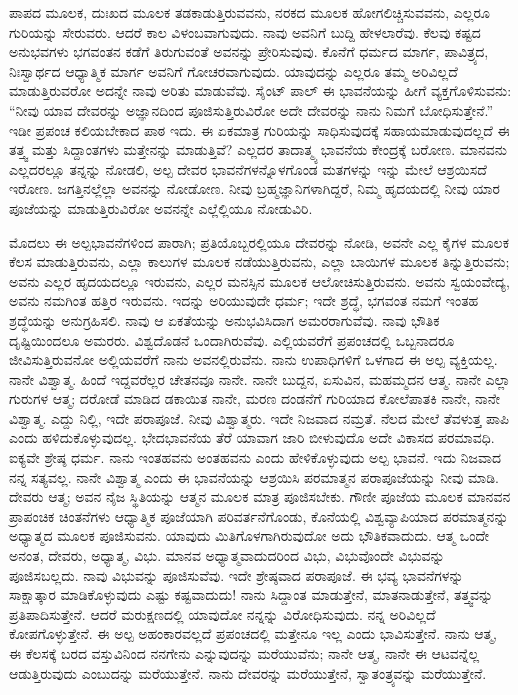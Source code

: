 ಪಾಪದ ಮೂಲಕ, ದುಃಖದ ಮೂಲಕ ತಡಕಾಡುತ್ತಿರುವವನು, ನರಕದ ಮೂಲಕ ಹೋಗಲಿಚ್ಚಿಸುವವನು, ಎಲ್ಲರೂ ಗುರಿಯನ್ನು ಸೇರುವರು. ಆದರೆ ಕಾಲ ವಿಳಂಬವಾಗುವುದು. ನಾವು ಅವನಿಗೆ ಬುದ್ದಿ ಹೇಳಲಾರೆವು. ಕೆಲವು ಕಷ್ಟದ ಅನುಭವಗಳು ಭಗವಂತನ ಕಡೆಗೆ ತಿರುಗುವಂತೆ ಅವನನ್ನು ಪ್ರೇರಿಸುವುವು. ಕೊನೆಗೆ ಧರ್ಮದ ಮಾರ್ಗ, ಪಾವಿತ್ರ್ಯದ, ನಿಃಸ್ವಾರ್ಥದ ಆಧ್ಯಾತ್ಮಿಕ ಮಾರ್ಗ ಅವನಿಗೆ ಗೋಚರವಾಗುವುದು. ಯಾವುದನ್ನು ಎಲ್ಲರೂ ತಮ್ಮ ಅರಿವಿಲ್ಲದೆ ಮಾಡುತ್ತಿರುವರೋ ಅದನ್ನೇ ನಾವು ಅರಿತು ಮಾಡುವೆವು. ಸೈಂಟ್ ಪಾಲ್ ಈ ಭಾವನೆಯನ್ನು ಹೀಗೆ ವ್ಯಕ್ತಗೊಳಿಸುವನು: “ನೀವು ಯಾವ ದೇವರನ್ನು ಅಜ್ಞಾನದಿಂದ ಪೂಜಿಸುತ್ತಿರುವಿರೋ ಅದೇ ದೇವರನ್ನು ನಾನು ನಿಮಗೆ ಬೋಧಿಸುತ್ತೇನೆ.'' ಇಡೀ ಪ್ರಪಂಚ ಕಲಿಯಬೇಕಾದ ಪಾಠ ಇದು. ಈ ಏಕಮಾತ್ರ ಗುರಿಯನ್ನು ಸಾಧಿಸುವುದಕ್ಕೆ ಸಹಾಯಮಾಡುವುದಲ್ಲದೆ ಈ ತತ್ತ್ವ ಮತ್ತು ಸಿದ್ದಾಂತಗಳು ಮತ್ತೇನನ್ನು ಮಾಡುತ್ತಿವೆ? ಎಲ್ಲದರ ತಾದಾತ್ಮ್ಯ ಭಾವನೆಯ ಕೇಂದ್ರಕ್ಕೆ ಬರೋಣ. ಮಾನವನು ಎಲ್ಲದರಲ್ಲೂ ತನ್ನನ್ನು ನೋಡಲಿ, ಅಲ್ಪ ದೇವರ ಭಾವನೆಗಳನ್ನೊಳಗೊಂಡ ಮತಗಳನ್ನು ಇನ್ನು ಮೇಲೆ ಆಶ್ರಯಿಸದೆ ಇರೋಣ. ಜಗತ್ತಿನಲ್ಲೆಲ್ಲಾ ಅವನನ್ನು ನೋಡೋಣ. ನೀವು ಬ್ರಹ್ಮಜ್ಞಾನಿಗಳಾಗಿದ್ದರೆ, ನಿಮ್ಮ ಹೃದಯದಲ್ಲಿ ನೀವು ಯಾರ ಪೂಜೆಯನ್ನು ಮಾಡುತ್ತಿರುವಿರೋ ಅವನನ್ನೇ ಎಲ್ಲೆಲ್ಲಿಯೂ ನೋಡುವಿರಿ.

ಮೊದಲು ಈ ಅಲ್ಪಭಾವನೆಗಳಿಂದ ಪಾರಾಗಿ; ಪ್ರತಿಯೊಬ್ಬರಲ್ಲಿಯೂ ದೇವರನ್ನು ನೋಡಿ, ಅವನೇ ಎಲ್ಲ ಕೈಗಳ ಮೂಲಕ ಕೆಲಸ ಮಾಡುತ್ತಿರುವನು, ಎಲ್ಲಾ ಕಾಲುಗಳ ಮೂಲಕ ನಡೆಯುತ್ತಿರುವನು, ಎಲ್ಲಾ ಬಾಯಿಗಳ ಮೂಲಕ ತಿನ್ನುತ್ತಿರುವನು; ಅವನು ಎಲ್ಲರ ಹೃದಯದಲ್ಲೂ ಇರುವನು, ಎಲ್ಲರ ಮನಸ್ಸಿನ ಮೂಲಕ ಆಲೋಚಿಸುತ್ತಿರುವನು. ಅವನು ಸ್ವಯಂವೇದ್ಯ, ಅವನು ನಮಗಿಂತ ಹತ್ತಿರ ಇರುವನು. ಇದನ್ನು ಅರಿಯುವುದೇ ಧರ್ಮ; ಇದೇ ಶ್ರದ್ಧೆ, ಭಗವಂತ ನಮಗೆ ಇಂತಹ ಶ್ರದ್ಧೆಯನ್ನು ಅನುಗ್ರಹಿಸಲಿ. ನಾವು ಆ ಏಕತೆಯನ್ನು ಅನುಭವಿಸಿದಾಗ ಅಮರರಾಗುವೆವು. ನಾವು ಭೌತಿಕ ದೃಷ್ಟಿಯಿಂದಲೂ ಅಮರರು. ವಿಶ್ವದೊಡನೆ ಒಂದಾಗಿರುವೆವು. ಎಲ್ಲಿಯವರೆಗೆ ಪ್ರಪಂಚದಲ್ಲಿ ಒಬ್ಬನಾದರೂ ಜೀವಿಸುತ್ತಿರುವನೋ ಅಲ್ಲಿಯವರೆಗೆ ನಾನು ಅವನಲ್ಲಿರುವೆನು. ನಾನು ಉಪಾಧಿಗಳಿಗೆ ಒಳಗಾದ ಈ ಅಲ್ಪ ವ್ಯಕ್ತಿಯಲ್ಲ. ನಾನೇ ವಿಶ್ವಾತ್ಮ. ಹಿಂದೆ ಇದ್ದವರೆಲ್ಲರ ಚೇತನವೂ ನಾನೇ. ನಾನೇ ಬುದ್ದನ, ಏಸುವಿನ, ಮಹಮ್ಮದನ ಆತ್ಮ. ನಾನೇ ಎಲ್ಲಾ ಗುರುಗಳ ಆತ್ಮ; ದರೋಡೆ ಮಾಡಿದ ಡಕಾಯಿತ ನಾನೇ, ಮರಣ ದಂಡನೆಗೆ ಗುರಿಯಾದ ಕೋಲೆಪಾತಕಿ ನಾನೇ, ನಾನೇ ವಿಶ್ವಾತ್ಮ. ಎದ್ದು ನಿಲ್ಲಿ, ಇದೇ ಪರಾಪೂಜೆ. ನೀವು ವಿಶ್ವಾತ್ಮರು. ಇದೇ ನಿಜವಾದ ನಮ್ರತೆ. ನೆಲದ ಮೇಲೆ ತೆವಳುತ್ತ ಪಾಪಿ ಎಂದು ಹಳಿದುಕೊಳ್ಳುವುದಲ್ಲ. ಭೇದಭಾವನೆಯ ತೆರೆ ಯಾವಾಗ ಜಾರಿ ಬೀಳುವುದೊ ಅದೇ ವಿಕಾಸದ ಪರಮಾವಧಿ. ಐಕ್ಯವೇ ಶ್ರೇಷ್ಠ ಧರ್ಮ. ನಾನು ಇಂತಹವನು ಅಂತಹವನು ಎಂದು ಹೇಳಿಕೊಳ್ಳುವುದು ಅಲ್ಪ ಭಾವನೆ. ಇದು ನಿಜವಾದ ನನ್ನ ಸತ್ಯವಲ್ಲ. ನಾನೇ ವಿಶ್ವಾತ್ಮ ಎಂದು ಈ ಭಾವನೆಯನ್ನು ಆಶ್ರಯಿಸಿ ಪರಮಾತ್ಮನ ಪರಾಪೂಜೆಯನ್ನು ನೀವು ಮಾಡಿ. ದೇವರು ಆತ್ಮ; ಅವನ ನೈಜ ಸ್ಥಿತಿಯನ್ನು ಆತ್ಮನ ಮೂಲಕ ಮಾತ್ರ ಪೂಜಿಸಬೇಕು. ಗೌಣೀ ಪೂಜೆಯ ಮೂಲಕ ಮಾನವನ ಪ್ರಾಪಂಚಿಕ ಚಿಂತನೆಗಳು ಆಧ್ಯಾತ್ಮಿಕ ಪೂಜೆಯಾಗಿ ಪರಿವರ್ತನೆಗೊಂಡು, ಕೊನೆಯಲ್ಲಿ ವಿಶ್ವವ್ಯಾಪಿಯಾದ ಪರಮಾತ್ಮನನ್ನು ಅಧ್ಯಾತ್ಮದ ಮೂಲಕ ಪೂಜಿಸುವನು. ಯಾವುದು ಮಿತಿಗೊಳಗಾಗಿರುವುದೋ ಅದು ಭೌತಿಕವಾದುದು. ಆತ್ಮ ಒಂದೇ ಅನಂತ, ದೇವರು, ಅಧ್ಯಾತ್ಮ, ವಿಭು. ಮಾನವ ಅಧ್ಯಾತ್ಮವಾದುದರಿಂದ ವಿಭು, ವಿಭುವೊಂದೇ ವಿಭುವನ್ನು ಪೂಜಿಸಬಲ್ಲದು. ನಾವು ವಿಭುವನ್ನು ಪೂಜಿಸುವೆವು. ಇದೇ ಶ್ರೇಷ್ಠವಾದ ಪರಾಪೂಜೆ. ಈ ಭವ್ಯ ಭಾವನೆಗಳನ್ನು ಸಾಕ್ಷಾತ್ಕಾರ ಮಾಡಿಕೊಳ್ಳುವುದು ಎಷ್ಟು ಕಷ್ಟವಾದುದು! ನಾನು ಸಿದ್ದಾಂತ ಮಾಡುತ್ತೇನೆ, ಮಾತನಾಡುತ್ತೇನೆ, ತತ್ತ್ವವನ್ನು ಪ್ರತಿಪಾದಿಸುತ್ತೇನೆ. ಆದರೆ ಮರುಕ್ಷಣದಲ್ಲಿ ಯಾವುದೋ ನನ್ನನ್ನು ವಿರೋಧಿಸುವುದು. ನನ್ನ ಅರಿವಿಲ್ಲದೆ ಕೋಪಗೊಳ್ಳುತ್ತೇನೆ. ಈ ಅಲ್ಪ ಅಹಂಕಾರವಲ್ಲದೆ ಪ್ರಪಂಚದಲ್ಲಿ ಮತ್ತೇನೂ ಇಲ್ಲ ಎಂದು ಭಾವಿಸುತ್ತೇನೆ. ನಾನು ಆತ್ಮ, ಈ ಕೆಲಸಕ್ಕೆ ಬರದ ವಸ್ತುವಿನಿಂದ ನನಗೇನು ಎನ್ನುವುದನ್ನು ಮರೆಯುವೆನು; ನಾನೇ ಆತ್ಮ, ನಾನೇ ಈ ಆಟವನ್ನೆಲ್ಲ ಆಡುತ್ತಿರುವುದು ಎಂಬುದನ್ನು ಮರೆಯುತ್ತೇನೆ. ನಾನು ದೇವರನ್ನು ಮರೆಯುತ್ತೇನೆ, ಸ್ವಾತಂತ್ರ್ಯವನ್ನು ಮರೆಯುತ್ತೇನೆ.

